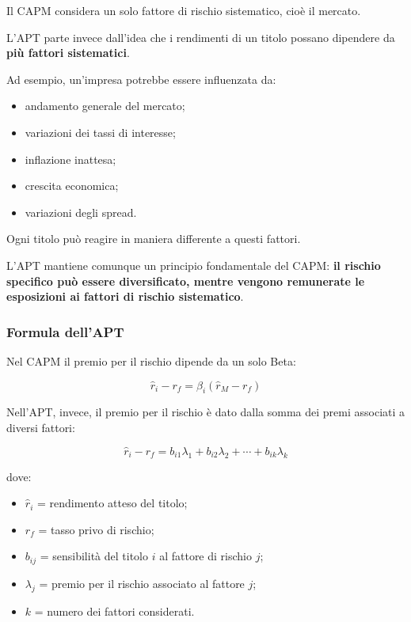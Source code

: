 \medskip

\noindent Il CAPM considera un solo fattore
di rischio sistematico, cioè il mercato.

\medskip

\noindent L'APT parte invece dall'idea che
i rendimenti di un titolo possano dipendere
da \textbf{più fattori sistematici}.

\medskip

\noindent Ad esempio, un'impresa potrebbe
essere influenzata da:

\begin{itemize}
    \item andamento generale del mercato;
    \item variazioni dei tassi di interesse;
    \item inflazione inattesa;
    \item crescita economica;
    \item variazioni degli spread.
\end{itemize}

\noindent Ogni titolo può reagire in maniera
differente a questi fattori.

\medskip

\noindent L'APT mantiene comunque
un principio fondamentale del CAPM:
\textbf{il rischio specifico può essere diversificato,
mentre vengono remunerate le esposizioni
ai fattori di rischio sistematico}.


\subsubsection*{Formula dell'APT}

\noindent Nel CAPM il premio per il rischio
dipende da un solo Beta:

\[
\hat{r}_i-r_f=
\beta_i(\hat{r}_M-r_f)
\]

\noindent Nell'APT, invece, il premio
per il rischio è dato dalla somma
dei premi associati a diversi fattori:

\[
\boxed{
\hat{r}_i-r_f=
b_{i1}\lambda_1+
b_{i2}\lambda_2+
\cdots+
b_{ik}\lambda_k
}
\]

\noindent dove:

\begin{itemize}
    \item $\hat{r}_i$ = rendimento atteso del titolo;
    \item $r_f$ = tasso privo di rischio;
    \item $b_{ij}$ = sensibilità del titolo $i$
    al fattore di rischio $j$;
    \item $\lambda_j$ = premio per il rischio
    associato al fattore $j$;
    \item $k$ = numero dei fattori considerati.
\end{itemize}

